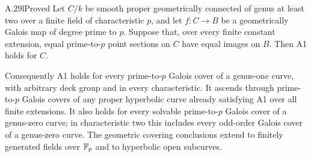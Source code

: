 \begin{claim}{A.29l}{Proved}
Let $C/k$ be smooth proper geometrically connected of genus
at least two over a finite field of characteristic $p$, and
let $f:C\to B$ be a geometrically Galois map of degree prime
to $p$. Suppose that, over every finite constant extension,
equal prime-to-$p$ point sections on $C$ have equal images
on $B$. Then A1 holds for $C$.

Consequently A1 holds for every prime-to-$p$ Galois cover
of a genus-one curve, with arbitrary deck group and in every
characteristic. It ascends through prime-to-$p$ Galois covers
of any proper hyperbolic curve already satisfying A1 over
all finite extensions. It also holds for every solvable
prime-to-$p$ Galois cover of a genus-zero curve; in
characteristic two this includes every odd-order Galois
cover of a genus-zero curve. The geometric covering
conclusions extend to finitely generated fields over
$\mathbb F_p$ and to hyperbolic open subcurves.
\end{claim}
